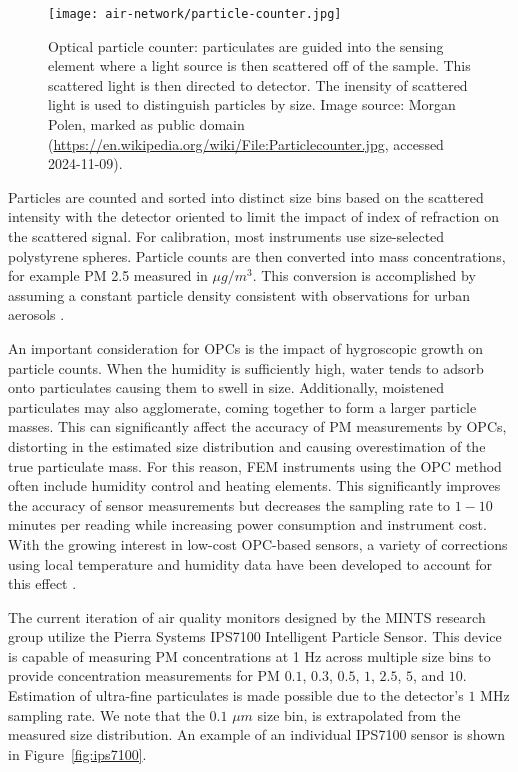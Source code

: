 \begin{figure}[h]
  \centering
  \texttt{[image: air-network/particle-counter.jpg]}
  \caption{Optical particle counter: particulates are guided into the sensing
    element where a light source is then scattered off of the sample. This scattered
  light is then directed to detector. The inensity of scattered light is used to
distinguish particles by size. Image source: Morgan Polen, marked as public domain
(\url{https://en.wikipedia.org/wiki/File:Particlecounter.jpg}, accessed 2024-11-09). }
  \label{fig:opc-diagram}
\end{figure}

Particles are counted and sorted into distinct size bins based on the scattered
intensity with the detector oriented to limit the impact of index
of refraction on the scattered signal. For calibration,
most instruments use size-selected polystyrene spheres. Particle counts are then
converted into mass concentrations, for example PM 2.5 measured in $\mu g/m^3$.
This conversion is accomplished by assuming a constant particle density
consistent with observations for urban aerosols \cite{pm-density}.

An important consideration for OPCs is the impact of hygroscopic growth on
particle counts. When the humidity is sufficiently high, water tends to adsorb
onto particulates causing them to swell in size. Additionally, moistened
particulates may also agglomerate, coming together to form a larger particle
masses. This can significantly affect the accuracy of PM measurements by OPCs,
distorting in the estimated size distribution and causing overestimation
of the true particulate mass. For this reason, FEM instruments using the OPC method
often include humidity control and heating elements. This significantly improves
the accuracy of sensor measurements but decreases the sampling rate to $1-10$
minutes per reading while increasing power consumption and instrument cost.
With the growing interest in low-cost OPC-based sensors, a variety of
corrections using local temperature and humidity data have been developed
to account for this effect \cite{opc-corrections}.

The current iteration of air quality monitors designed by the MINTS research
group utilize the Pierra Systems IPS7100 Intelligent Particle Sensor. This
device is capable of measuring PM concentrations at 1 Hz across multiple size bins
to provide concentration measurements for PM $0.1$, $0.3$, $0.5$, $1$, $2.5$, $5$,
and $10$. Estimation of ultra-fine particulates is made possible due to the
detector's $1$ MHz sampling rate. We note that the $0.1$ $\mu m$ size bin, is
extrapolated from the measured size distribution. An example of an individual
IPS7100 sensor is shown in Figure~\ref{fig:ips7100}.


